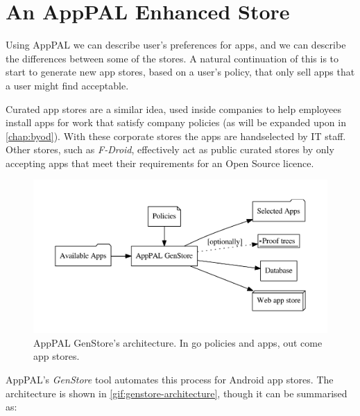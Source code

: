\documentclass[thesis.tex]{subfiles}
\begin{document}
\section{An AppPAL Enhanced Store}

Using AppPAL we can describe user's preferences for apps, and we can describe
the differences between some of the stores.  A natural continuation of this is
to start to generate new app stores, based on a user's policy, that only sell
apps that a user might find acceptable.

Curated app stores are a similar idea, used inside companies to help employees
install apps for work that satisfy company policies (as will be expanded upon
in \autoref{chap:byod}).  With these corporate stores the apps are handselected
by IT staff.  Other stores, such as \emph{F-Droid}, effectively act as public
curated stores by only accepting apps that meet their requirements for an Open
Source licence.

\begin{figure}\centering
  \includegraphics[width=\textwidth]{figures/genstore.pdf}
  \caption[AppPAL GenStore's architecture.]{AppPAL GenStore's architecture.  In go policies and apps, out come app stores.}
  \label{fig:genstore-architecture}
\end{figure}

AppPAL's \emph{GenStore} tool automates this process for Android app stores.  The architecture is shown in \autoref{gif:genstore-architecture}, though it can be summarised as:
\end{document}
